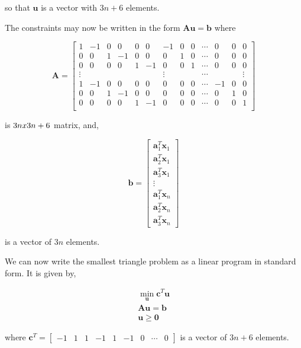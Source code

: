 \documentclass{article}
\begin{document}
\noindent so that $\mathbf{u}$ is a vector with $3n + 6$ elements.

The constraints may now be written in the form $\mathbf{A} \mathbf{u} = \mathbf{b}$ where

\begin{equation}
\mathbf{A} = \left[ \begin{smallmatrix}
1 & -1 & 0 & 0 & 0 & 0 & -1 & 0 & 0 & \cdots & 0 & 0 & 0\\
0 & 0 & 1 & -1 & 0 & 0 & 0 & 1 & 0 & \cdots & 0 & 0 & 0\\
0 & 0 & 0 & 0 & 1 & -1 & 0 & 0 & 1 & \cdots & 0 & 0 & 0\\
\vdots & & & & & & \vdots & & & \cdots & & & \vdots\\
1 & -1 & 0 & 0 & 0 & 0 & 0 & 0 & 0 & \cdots & -1 & 0 & 0\\
0 & 0 & 1 & -1 & 0 & 0 & 0 & 0 & 0 & \cdots & 0 & 1 & 0\\
0 & 0 & 0 & 0 & 1 & -1 & 0 & 0 & 0 & \cdots & 0 & 0 & 1\\
\end{smallmatrix} \right]
\end{equation}

\noindent is $3n \mathnormal{x} 3n+6$ matrix, and,

\begin{equation}
\mathbf{b} = \begin{bmatrix}
\mathbf{a}^T_1 \mathbf{x}_1\\
\mathbf{a}^T_2 \mathbf{x}_1\\
\mathbf{a}^T_3 \mathbf{x}_1\\
\vdots\\
\mathbf{a}^T_1 \mathbf{x}_n\\
\mathbf{a}^T_2 \mathbf{x}_n\\
\mathbf{a}^T_3 \mathbf{x}_n
\end{bmatrix}
\end{equation}

\noindent is a vector of $3n$ elements.

We can now write the smallest triangle problem as a linear program in standard form. It is given by,

\begin{eqnarray*}
\min_\mathbf{u} \mathbf{c}^T \mathbf{u}\\
\mathbf{A} \mathbf{u} = \mathbf{b}\\
\mathbf{u} \ge \mathbf{0}
\end{eqnarray*}

\noindent where $\mathbf{c}^T = \begin{bmatrix}-1 & 1 & 1 & -1 & 1 & -1 & 0 & \cdots & 0\end{bmatrix}$ is a vector of $3n + 6$ elements.
\end{document}

